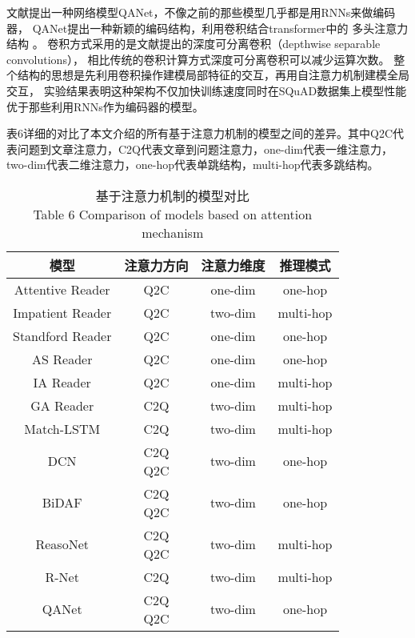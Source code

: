 文献\cite{QANet}提出一种网络模型QANet，不像之前的那些模型几乎都是用RNNs来做编码器，
QANet提出一种新颖的编码结构，利用卷积结合transformer中的
多头注意力结构
。
卷积方式采用的是文献\cite{DSC}提出的深度可分离卷积（depthwise 
separable convolutions），
相比传统的卷积计算方式深度可分离卷积可以减少运算次数。
整个结构的思想是先利用卷积操作建模局部特征的交互，再用自注意力机制建模全局交互，
实验结果表明这种架构不仅加快训练速度同时在SQuAD数据集上模型性能优于那些利用RNNs作为编码器的模型。

表6详细的对比了本文介绍的所有基于注意力机制的模型之间的差异。其中Q2C代表问题到文章注意力，C2Q代表文章到问题注意力，one-dim代表一维注意力，two-dim代表二维注意力，one-hop代表单跳结构，multi-hop代表多跳结构。
\begin{table}[ht]
	\centering
	\caption{基于注意力机制的模型对比 \\ Table 6 Comparison of models based on attention mechanism}
	\begin{tabular}{c c c c}
		\toprule
		模型&注意力方向&注意力维度&推理模式 \\
		\midrule
		Attentive Reader\upcite{Hermann}&Q2C&one-dim&one-hop \\
		\midrule
		Impatient Reader\upcite{Hermann}&Q2C&two-dim&multi-hop \\
		\midrule
		Standford Reader\upcite{AR}&Q2C&one-dim&one-hop \\
		\midrule
		AS Reader\upcite{ASR}&Q2C&one-dim&one-hop \\
		\midrule
		IA Reader\upcite{IAReader}&Q2C&one-dim&multi-hop \\
		\midrule
		GA Reader\upcite{GAReader}&C2Q&two-dim&multi-hop \\
		\midrule
		Match-LSTM\upcite{MatchLSTM}&C2Q&two-dim&multi-hop \\
		\midrule
		DCN\upcite{DCN}&\tabincell{c}{C2Q \\
			Q2C}&two-dim&one-hop \\           
		\midrule
		BiDAF\upcite{BiDAF}&\tabincell{c}{C2Q\\ Q2C}&two-dim&one-hop \\
		\midrule
		ReasoNet\upcite{Reasonet}&\tabincell{c}{C2Q\\ Q2C}&two-dim&multi-hop\\
		\midrule
		R-Net\upcite{RNet}&C2Q&two-dim&multi-hop \\
		\midrule
		QANet\upcite{QANet}&\tabincell{c}{C2Q\\ Q2C}&two-dim&one-hop\\
		\bottomrule
	\end{tabular}
\end{table}

